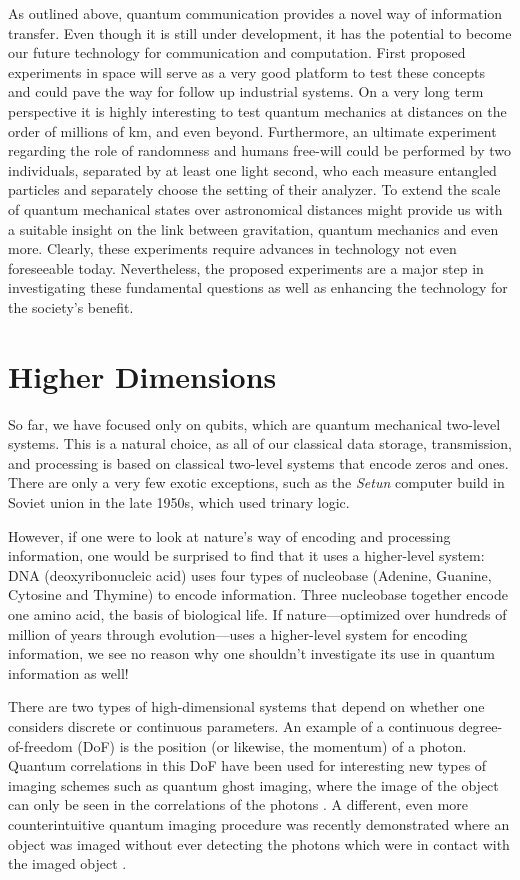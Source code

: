 \documentclass{article}
\begin{document}
As outlined above, quantum communication provides a novel way of information transfer. Even though it is still under development, it has the potential to become our future technology for communication and computation. First proposed experiments in space will serve as a very good platform to test these concepts and could pave the way for follow up industrial systems. On a very long term perspective it is highly interesting to test quantum mechanics at distances on the order of millions of km, and even beyond. Furthermore, an ultimate experiment regarding the role of randomness and humans free-will could be performed by two individuals, separated by at least one light second, who each measure entangled particles and separately choose the setting of their analyzer. To extend the scale of quantum mechanical states over astronomical distances might provide us with a suitable insight on the link between gravitation, quantum mechanics and even more. Clearly, these experiments require advances in technology not even foreseeable today. Nevertheless, the proposed experiments are a major step in investigating these fundamental questions as well as enhancing the technology for the society's benefit.

\section{Higher Dimensions}
So far, we have focused only on qubits, which are quantum mechanical two-level systems. This is a natural choice, as all of our classical data storage, transmission, and processing is based on classical two-level systems that encode zeros and ones. There are only a very few exotic exceptions, such as the \textit{Setun} computer build in Soviet union in the late 1950s, which used trinary logic.

However, if one were to look at nature's way of encoding and processing information, one would be surprised to find that it uses a higher-level system: DNA (deoxyribonucleic acid) uses four types of nucleobase (Adenine, Guanine, Cytosine and Thymine) to encode information. Three nucleobase together encode one amino acid, the basis of biological life. If nature---optimized over hundreds of million of years through evolution---uses a higher-level system for encoding information, we see no reason why one shouldn't investigate its use in quantum information as well!

There are two types of high-dimensional systems that depend on whether one considers discrete or continuous parameters. An example of a continuous degree-of-freedom (DoF) is the position (or likewise, the momentum) of a photon. Quantum correlations in this DoF have been used for interesting new types of imaging schemes such as quantum ghost imaging, where the image of the object can only be seen in the correlations of the photons \cite{Pittman:1995jb,Strekalov:1995ub,Malik:2010cr}. A different, even more counterintuitive quantum imaging procedure was recently demonstrated where an object was imaged without ever detecting the photons which were in contact with the imaged object \cite{Lemos:2014gw}. 
\end{document}
